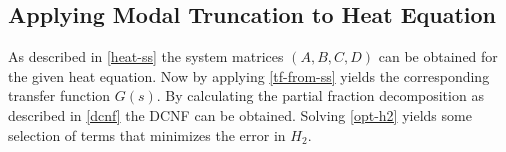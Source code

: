 \subsection{Applying Modal Truncation to Heat Equation}
As described in \ref{heat-ss} the system matrices \((A, B, C, D)\) can be obtained for the given heat equation.
Now by applying \ref{tf-from-ss} yields the corresponding transfer function \(G(s)\).
By calculating the partial fraction decomposition as described in \ref{dcnf} the DCNF can be obtained.
Solving \ref{opt-h2} yields some selection of terms that minimizes the error in \(H_2\).

